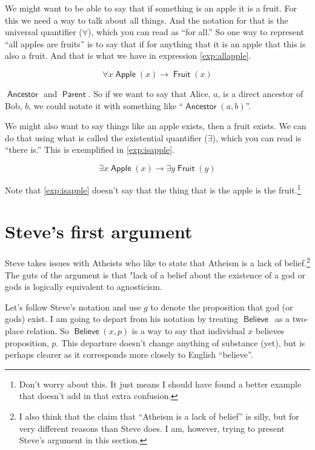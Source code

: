 \documentclass[12pt]{article}
\providecommand{\lif}{\rightarrow}
\providecommand{\lall}{\forall}
\providecommand{\lis}{\exists}
\newcommand{\rel}[1]{\ensuremath{\mathop{\mathsf{#1}}}}
\newcommand{\rlan}{\rel{Ancestor}}
\newcommand{\rlpt}{\rel{Parent}}
\newcommand{\rlapple}{\rel{Apple}}
\newcommand{\rlfruit}{\rel{Fruit}}
\newcommand{\rlbelieve}{\rel{Believe}}
\begin{document}
We might want to be able to say that if something is an apple it is a fruit.
For this we need a way to talk about all things. And the notation for that is the universal quantifier ($\lall$), which you can read as “for all.” So one way to represent “all apples are fruits” is to say that if for anything that it is an apple that this is also a fruit. And that is what we have in expression \ref{exp:allapple}.

\begin{equation}\label{exp:allapple}
    \lall x \rlapple(x) \lif \rlfruit(x)
\end{equation}

$\rlan$ and $\rlpt$. So if we want to say that Alice, $a$, is a direct ancestor of Bob, $b$, we could notate it with something like “$\rlan(a, b)$”.

We might also want to say things like an apple exists, then a fruit exists.
We can do that using what is called the existential quantifier ($\lis$), which you can read is “there is.” This is exemplified in \ref{exp:isapple}.

\begin{equation}\label{exp:isapple}
    \lis x \rlapple(x) \lif \lis y \rlfruit(y)
\end{equation}

Note that \ref{exp:isapple} doesn't say that the thing that is the apple is the fruit.\footnote{Don't worry about this. It just means I should have found a better example that doesn't add in that extra confusion.}

\section{Steve's first argument}\label{sec:first}

Steve takes issues with Atheists who like to state that Atheism is a lack of belief.\footnote{I also think that the claim that “Atheism is a lack of belief” is silly, but for very different reasons than Steve does. I am, however, trying to present Steve's argument in this section.}
The guts of the argument is that "lack of a belief about the existence of a god or gods is logically equivalent to agnosticism.

Let's follow Steve's notation and use $g$ to denote the proposition that god (or gods) exist.
I am going to depart from his notation by treating \rlbelieve\ as a two-place relation. So $\rlbelieve(x, p)$ is a way to say that individual $x$ believes proposition, $p$. This departure doesn't change anything of substance (yet), but is perhaps clearer as it corresponds more closely to English “believe”.
\end{document}
